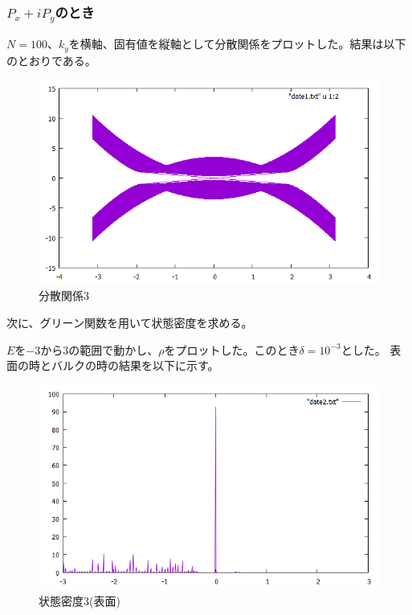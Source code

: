 \documentclass{jsarticle}
\begin{document}
            \subsubsection{$P_x+iP_y$のとき}
            $N=100$、$k_y$を横軸、固有値を縦軸として分散関係をプロットした。結果は以下のとおりである。
    
            \begin{figure}[H]
                \centering
                \includegraphics[scale=0.5]{BdG3_bry.png}
                \caption{分散関係3}
                \label{Dispersion3}
            \end{figure}
    
            次に、グリーン関数を用いて状態密度を求める。
           
            $E$を$-3$から$3$の範囲で動かし、$\rho$をプロットした。このとき$\delta=10^{-3}$とした。
            表面の時とバルクの時の結果を以下に示す。
    
            \begin{figure}[H]
                \centering
                \includegraphics[scale=0.5]{LDOS3_bry.png}
                \caption{状態密度3(表面)}
                \label{LDOS3}
            \end{figure}
\end{document}
